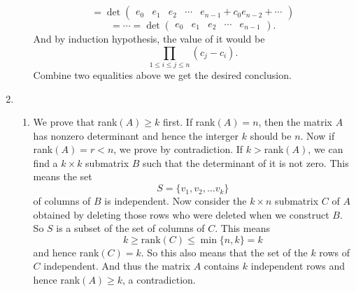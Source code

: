\begin{enumerate}
\begin{enumerate}
\[=\det\begin{pmatrix}e_0&e_1&e_2&\cdots &e_{n-1}+c_0e_{n-2}+\cdots \end{pmatrix}\] 
\[=\cdots =\det\begin{pmatrix}e_0&e_1&e_2&\cdots &e_{n-1}\end{pmatrix}.\]
And by induction hypothesis, the value of it would be 
\[\prod_{1\leq i \leq j \leq n}{(c_j-c_i)}.\]
Combine two equalities above we get the desired conclusion.
\end{enumerate}
\item \begin{enumerate}
\item We prove that rank$(A)\geq k$ first. If rank$(A)=n$, then the matrix $A$ has nonzero determinant and hence the interger $k$ should be $n$. Now if rank$(A)=r<n$, we prove by contradiction. If $k>$rank$(A)$, we can find a $k\times k$ submatrix $B$ such that the determinant of it is not zero. This means the set 
\[S=\{v_1,v_2,\ldots v_k\}\]
 of columns of $B$ is independent. Now consider the $k\times n$ submatrix $C$ of $A$ obtained by deleting those rows who were deleted when we construct $B$. So $S$ is a subset of the set of columns of $C$. This means 
 \[k\geq \mathrm{rank}(C)\leq \min\{n,k\}=k\]
 and hence rank$(C)=k$. So this also means that the set of the $k$ rows of $C$ independent. And thus the matrix $A$ contains $k$ independent rows and hence rank$(A)\geq k$, a contradiction.
 

\end{enumerate}
\end{enumerate}
